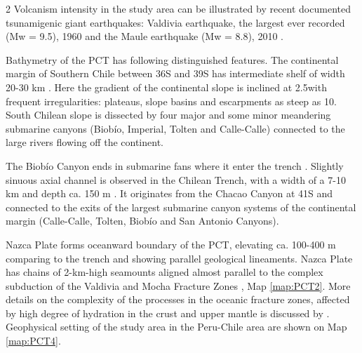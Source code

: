 \documentclass[11pt,a4paper]{report}
\begin{document}
\begin{multicols}{2}
Volcanism intensity in the study area can be illustrated by recent documented tsunamigenic giant earthquakes: Valdivia earthquake, the largest ever recorded (Mw = 9.5), 1960 and the Maule earthquake (Mw = 8.8), 2010 \cite{Contrerasetal2010}. 

Bathymetry of the \ac{PCT} has following distinguished features. The continental margin of Southern Chile between 36\degree\space S and 39\degree\space S has intermediate shelf of width 20-30 km \cite{Voelkeretal2008}. Here the gradient of the continental slope is inclined at 2.5\degree with frequent irregularities: plateaus, slope basins and escarpments as steep as 10\degree. South Chilean slope is dissected by four major and some minor meandering submarine canyons (Biobío, Imperial, Tolten and Calle-Calle) connected to the large rivers flowing off the continent. 

The Biobío Canyon ends in submarine fans where it enter the trench \cite{ThornburgKulm}. Slightly sinuous axial channel is observed in the Chilean Trench, with a width of a 7-10 km and depth ca. 150 m \cite{Voelkeretal2008}. It originates from the Chacao Canyon at 41\degree S and connected to the exits of the largest submarine canyon systems of the continental margin (Calle-Calle, Tolten, Biobío and San Antonio Canyons). 

Nazca Plate forms oceanward boundary of the \ac{PCT}, elevating ca. 100-400 m comparing to the trench and showing parallel geological lineaments. Nazca Plate has chains of 2-km-high seamounts aligned almost parallel to the complex subduction of the Valdivia and Mocha Fracture Zones \cite{ContrerasReyesetal2013}, Map \ref{map:PCT2}. More details on the complexity of the processes in the oceanic fracture zones, affected by high degree of hydration in the crust and upper mantle is discussed by \cite{Contreras2008}. Geophysical setting of the study area in the Peru-Chile area are shown on Map \ref{map:PCT4}.
	

\end{multicols}
\end{document}
